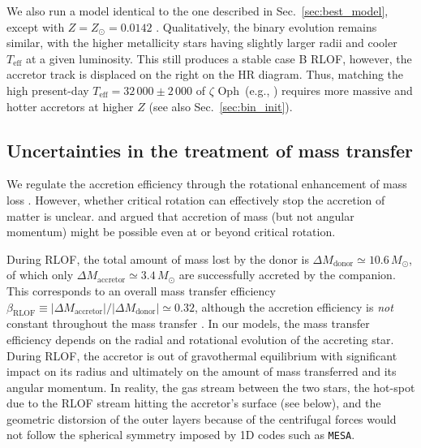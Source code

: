 \documentclass[twocolumn,twocolappendix,trackchanges]{aastex63}
\DeclareRobustCommand{\Secref}[1]{Sec.~\ref{#1}}
\newcommand{\zoph}{$\zeta$ Oph}
\begin{document}
We also run a model identical to the one described in
\Secref{sec:best_model}, except with $Z=Z_\odot=0.0142$
\citep{asplund:09}. Qualitatively, the binary evolution remains
similar, with the higher metallicity stars having slightly larger
radii and cooler $T_\mathrm{eff}$ at a given luminosity. This still
produces a stable case B RLOF, however, the accretor track is
displaced on the right on the HR diagram. Thus, matching the high present-day
$T_\mathrm{eff}=32\,000\pm2\,000$ of \zoph\ (e.g., ) requires more
massive and hotter accretors at higher $Z$ (see also \Secref{sec:bin_init}).


\subsection{Uncertainties in the treatment of mass transfer}
\label{sec:bin_param}

We regulate the accretion efficiency through the rotational
enhancement of mass loss \citep[e.g.,][]{langer:98}.
However, whether critical rotation can effectively stop the accretion
of matter is unclear. \cite{popham:91} and \cite{paczynski:91}
argued that accretion of mass (but not angular momentum) might be
possible even at or beyond critical rotation.

During RLOF, the total amount of mass lost by the donor is
$\Delta M_\mathrm{donor} \simeq 10.6\,M_\odot$, of which only
$\Delta M_\mathrm{accretor}\simeq 3.4\,M_\odot$ are successfully
accreted by the companion. This corresponds to an overall mass transfer efficiency
$\beta_\mathrm{RLOF}\equiv |\Delta M_\mathrm{accretor}|/|\Delta M_\mathrm{donor}| \simeq 0.32$,
although the accretion efficiency is \emph{not} constant throughout
the mass transfer \citep[e.g.,][]{vanrensbergen:06}. In our models,
the mass transfer efficiency depends on the radial and rotational
evolution of the accreting star. During RLOF, the accretor is out of
gravothermal equilibrium with significant impact on its radius and
ultimately on the amount of mass transferred and its angular
momentum. In reality, the gas stream between the two stars, the
hot-spot due to the RLOF stream hitting the accretor's surface (see below), and
the geometric distorsion of the outer layers because of the
centrifugal forces would not follow the spherical symmetry imposed by
1D codes such as \texttt{MESA}.
\end{document}
